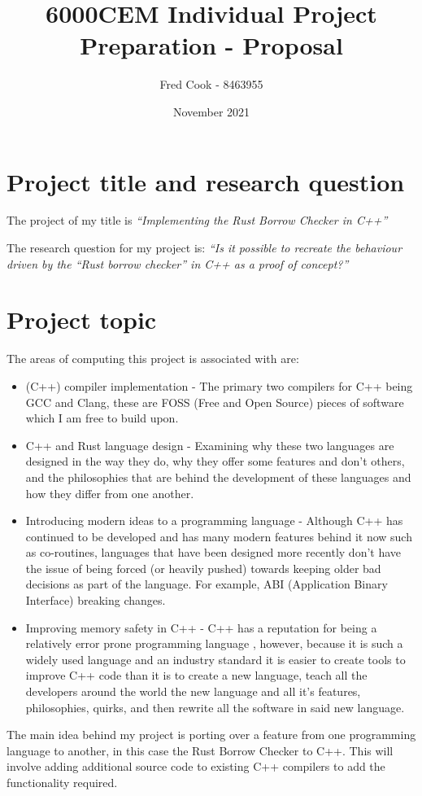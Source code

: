 \documentclass{article}
\title{6000CEM Individual Project Preparation - Proposal}
\author{Fred Cook - 8463955}
\date{November 2021}
\begin{document}
\maketitle
\newpage

\tableofcontents
\newpage

\section{Project title and research question}
The project of my title is \emph{``Implementing the Rust Borrow Checker in C++''}


The research question for my project is: \emph{``Is it possible to recreate the behaviour driven by the ``Rust borrow checker'' in C++ as a proof of concept?''}

\section{Project topic}
The areas of computing this project is associated with are:
\begin{itemize}
	\item{(C++) compiler implementation - The primary two compilers for C++ being GCC and Clang, these are FOSS (Free and Open Source) pieces of software which I am free to build upon.}
	\item{C++ and Rust language design - Examining why these two languages are designed in the way they do, why they offer some features and don't others, and the philosophies that are behind the development of these languages and how they differ from one another.}
	\item{Introducing modern ideas to a programming language - Although C++ has continued to be developed and has many modern features behind it now such as co-routines, languages that have been designed more recently don't have the issue of being forced (or heavily pushed) towards keeping older bad decisions as part of the language. For example, ABI (Application Binary Interface) breaking changes.}
	\item{Improving memory safety in C++ - C++ has a reputation for being a relatively error prone programming language \parencite{error_prone_languages}, however, because it is such a widely used language and an industry standard it is easier to create tools to improve C++ code than it is to create a new language, teach all the developers around the world the new language and all it's features, philosophies, quirks, and then rewrite all the software in said new language.}
\end{itemize}
The main idea behind my project is porting over a feature from one programming language to another, in this case the Rust Borrow Checker to C++. This will involve adding additional source code to existing C++ compilers to add the functionality required.
\end{document}
